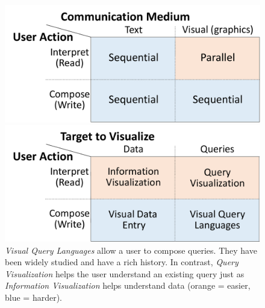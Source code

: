 \documentclass[letterpaper,11pt]{article}
\begin{document}
\begin{figure}[t]
\centering
\begin{minipage}{0.50\textwidth}
	\includegraphics[scale=0.35]{figs/Fig_MatrixDataQueryNew}
	\caption{%
	    \emph{Composing} a query with a visual query language is as sequential as composing it with SQL. 
        \emph{Interpreting} a visualization (whether of information or a query) 
		is the only modus in which a user can act on information in parallel, 
		leveraging the speed of the human perceptual system 
		(orange = easier, blue = harder).
    }
    \label{Fig_MatrixDataQueryNew}
\end{minipage}
\hfill
\begin{minipage}{0.45\textwidth}
	\includegraphics[scale=0.35]{figs/Fig_MatrixTextGraphicsNew}
	\caption{%
	    \emph{Visual Query Languages} allow a user to compose queries. 
		They have been widely studied and have a rich history.
	    In contrast, \emph{Query Visualization} helps the user understand an existing query 
		just as \emph{Information Visualization} helps understand data 
		(orange = easier, blue = harder).
    }
	\label{Fig_MatrixTextGraphics}
\end{minipage}
\end{figure}
\end{document}
